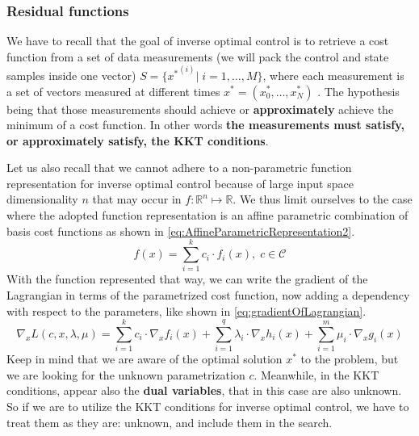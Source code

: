 \documentclass[12pt, a4paper]{article}
\begin{document}
\subsubsection{Residual functions}
We have to recall that the goal of inverse optimal control is to retrieve a cost function from a set of data measurements (we will pack the control and state samples inside one vector) \( S = \{ {x^*}^{(i)} | \; i = 1, \ldots, M \} \), where each measurement is a set of vectors measured at different times \( x^* = (x^*_0, \ldots, x^*_N ) \) . The hypothesis being that those measurements should achieve or \textbf{approximately} achieve the minimum of a cost function. In other words \textbf{the measurements must satisfy, or approximately satisfy, the KKT conditions}.\par
Let us also recall that we cannot adhere to a non-parametric function representation for inverse optimal control because of large input space dimensionality \( n\) that may occur in \( f : \mathbb{R}^n \mapsto \mathbb{R} \). We thus limit ourselves to the case where the adopted function representation is an affine parametric combination of basis cost functions as shown in \eqref{eq:AffineParametricRepresentation2}.
\begin{equation} \label{eq:AffineParametricRepresentation2}
    f(x) = \sum_{i=1}^k c_i \cdot f_i(x), \; c \in \mathcal{C}
\end{equation}
With the function represented that way, we can write the gradient of the Lagrangian in terms of the parametrized cost function, now adding a dependency with respect to the parameters, like shown in \eqref{eq:gradientOfLagrangian}.
\begin{equation} \label{eq:gradientOfLagrangian}
    \nabla_x L(c, x, \lambda, \mu) = \sum_{i=1}^k c_i \cdot \nabla_x f_i(x) + \sum_{i=1}^q \lambda_i \cdot \nabla_x h_i(x) + \sum_{i=1}^m \mu_i \cdot \nabla_x g_i(x)
\end{equation}
Keep in mind that we are aware of the optimal solution \( x^*\) to the problem, but we are looking for the unknown parametrization \( c\). Meanwhile, in the KKT conditions, appear also the \textbf{dual variables}, that in this case are also unknown. So if we are to utilize the KKT conditions for inverse optimal control, we have to treat them as they are: unknown, and include them in the search.\par
\end{document}
